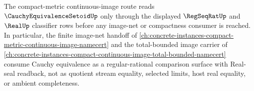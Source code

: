 The compact-metric continuous-image route reads $\CauchyEquivalenceSetoidUp$ only through the displayed $\RegSeqRatUp$ and $\RealUp$ classifier rows before any image-net or compactness consumer is reached. In particular, the finite image-net handoff of \autoref{ch:concrete-instances-compact-metric-continuous-image-namecert} and the total-bounded image carrier of \autoref{ch:concrete-instances-compact-continuous-image-total-bounded-namecert} consume Cauchy equivalence as a regular-rational comparison surface with Real-seal readback, not as quotient stream equality, selected limits, host real equality, or ambient completeness.
